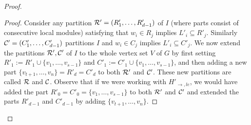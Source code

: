 \begin{proof}
\begin{proof}
Consider any partition ${\cal R}'=(R'_1,\dots ,R'_{d-1})$ of $I$ (where parts consist of consecutive local modules) satisfying that $w_i\in R_j$ implies $L'_i \subseteq R'_j$. Similarly ${\cal C}'=(C'_1,\dots ,C'_{d-1})$ partitions $I$ and $w_i\in C_j$ implies $L'_i \subseteq C'_j$. We now extend the partitions ${\cal R}',{\cal C}'$ of $I$ to the whole vertex set $V$ of $G$ by first setting $R'_1:=R'_1\cup \{v_1,\dots ,v_{s-1}\}$ and $C'_1:=C'_1\cup \{v_1,\dots ,v_{s-1}\}$, and then adding a new part $\{v_{t+1},\dots ,v_{n}\}=R'_d=C'_d$ to both ${\cal R}'$ and ${\cal C}'$. These new partitions are called ${\cal R}$ and ${\cal C}$. Observe that if we were working with $H'_{\rightarrow,le}$, we would have added the part $R'_0=C'_0=\{v_1,\dots ,v_{s-1}\}$ to both ${\cal R}'$ and ${\cal C}'$ and extended the parts $R'_{d-1}$ and $C'_{d-1}$ by adding $\{v_{t+1},\dots ,v_{n}\}$. 



\end{proof}
\end{proof}
